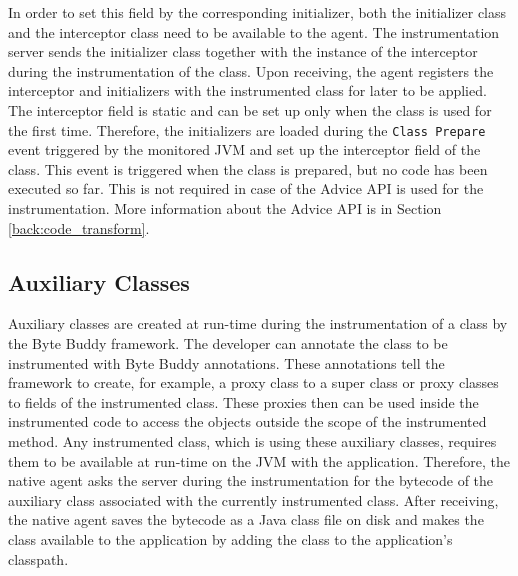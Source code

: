 In order to set this field by the corresponding initializer, both the initializer class and the interceptor class need to be available to the agent. The instrumentation server sends the initializer class together with the instance of the interceptor during the instrumentation of the class. Upon receiving, the agent registers the interceptor and initializers with the instrumented class for later to be applied. The interceptor field is static and can be set up only when the class is used for the first time. Therefore, the initializers are loaded during the \texttt{Class Prepare} event triggered by the monitored JVM and set up the interceptor field of the class. This event is triggered when the class is prepared, but no code has been executed so far. This is not required in case of the Advice API is used for the instrumentation. More information about the Advice API is in Section \ref{back:code_transform}.

\subsection{Auxiliary Classes}
Auxiliary classes are created at run-time during the instrumentation of a class by the Byte Buddy framework. The developer can annotate the class to be instrumented with Byte Buddy annotations. These annotations tell the framework to create, for example, a proxy class to a super class or proxy classes to fields of the instrumented class. These proxies then can be used inside the instrumented code to access the objects outside the scope of the instrumented method. Any instrumented class, which is using these auxiliary classes, requires them to be available at run-time on the JVM with the application. Therefore, the native agent asks the server during the instrumentation for the bytecode of the auxiliary class associated with the currently instrumented class. After receiving, the native agent saves the bytecode as a Java class file on disk and makes the class available to the application by adding the class to the application's classpath.

